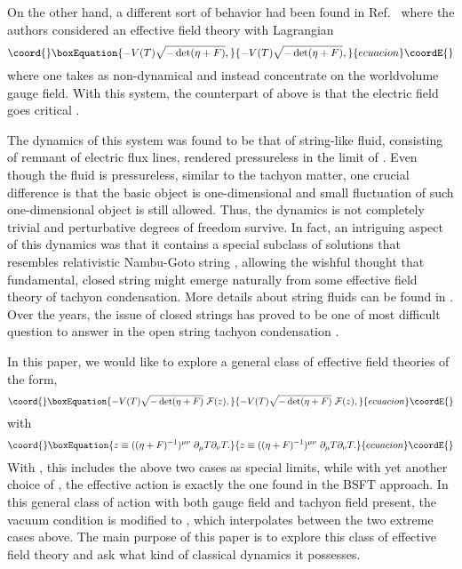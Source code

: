 \documentclass[a4paper,12pt]{article}
\begin{document}
On the other hand, a different sort of behavior had been found in 
Ref.~\cite{fluid}
where the authors considered an effective field theory with Lagrangian
\cite{potential}
\begin{equation}\coord{}\boxEquation{
-V(T)\sqrt{-\det (\eta+F)},
}{
-V(T)\sqrt{-\det (\eta+F)},
}{ecuacion}\coordE{}\end{equation}
where one takes \coordHE{} as non-dynamical and instead concentrate on 
the worldvolume gauge field. With this system, the counterpart of
\coordHE{} above is that the electric field goes critical \coordHE{}.

The dynamics of this system was found to
be that of string-like fluid, consisting of remnant of electric
flux lines, rendered pressureless in the limit of \coordHE{}.
Even though the fluid is pressureless, similar to the tachyon matter,
one crucial difference is that the basic object is one-dimensional
and small fluctuation of such one-dimensional object is still
allowed. Thus, the dynamics is not completely trivial and 
perturbative degrees of freedom survive. In fact, an
intriguing aspect of this dynamics was that it contains a special
subclass of solutions that resembles relativistic Nambu-Goto string
\cite{fluid,followup},
allowing the  wishful thought that fundamental, closed string might 
emerge naturally from some effective field theory of tachyon 
condensation. More details about string fluids can be found in
\cite{Gibbons2}. Over the years, the issue of closed strings has proved
to be one of most difficult question to answer in the open string
tachyon condensation \cite{fluid,yi,conf,shenker}.

In this paper, we would like to explore a general class of effective
field theories  of the form,
\begin{equation}\coord{}\boxEquation{
-V(T)\sqrt {-\det (\eta+F)}\;{\cal F}(z),
}{
-V(T)\sqrt {-\det (\eta+F)}\;{\cal F}(z),
}{ecuacion}\coordE{}\end{equation}
with 
\begin{equation}\coord{}\boxEquation{
z\equiv ((\eta+F)^{-1})^{\mu\nu}\;\partial_\mu T\partial_\nu T.
}{
z\equiv ((\eta+F)^{-1})^{\mu\nu}\;\partial_\mu T\partial_\nu T.
}{ecuacion}\coordE{}\end{equation}
With \coordHE{}, this includes the above two cases
as special limits, while with yet another choice of \coordHE{}, the
effective action is exactly the one found in the  BSFT approach. In this
general class of action with both gauge field and tachyon field
present, the vacuum condition is modified to \coordHE{},
which interpolates between the two extreme cases above. The
main purpose of this paper is to explore this class of 
effective field theory and ask what kind of classical dynamics
it possesses. 
\end{document}
